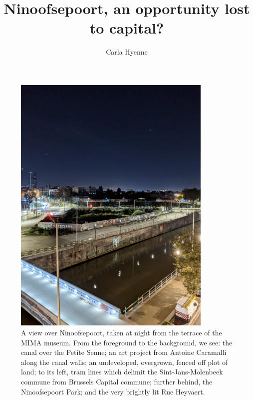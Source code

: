 \documentclass{article}[11pt]
\title{Ninoofsepoort, an opportunity lost to capital?}
\author{Carla Hyenne}
\date{}
\begin{document}

\maketitle

\begin{figure}[h!]
	\centering
	\captionsetup{labelformat=empty}
	\includegraphics[width=0.85\textwidth, angle=-90]{bxl_canal_far}
	\caption{A view over Ninoofsepoort, taken at night from the terrace of the MIMA museum. From the foreground to the background, we see: the canal over the Petite Senne; an art project from Antoine Caramalli along the canal walls; an undeveloped, overgrown, fenced off plot of land; to its left, tram lines which delimit the Sint-Jans-Molenbeek commune from Brussels Capital commune; further behind, the Ninoofsepoort Park; and the very brightly lit Rue Heyvaert.}
\end{figure}

\restoregeometry

\pagebreak
\end{document}
